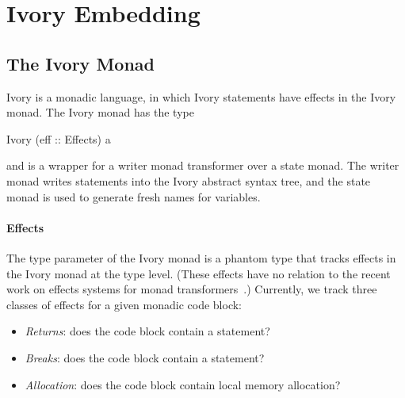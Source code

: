 \section{Ivory Embedding}
\label{sec:ivory-embedding}


\subsection{The Ivory Monad}



Ivory is a monadic language, in which Ivory statements have effects in the Ivory
monad. The Ivory monad has the type

\begin{code}
Ivory (eff :: Effects) a
\end{code}

\noindent
and is a wrapper for a writer monad transformer over a state monad. The writer
monad writes statements into the Ivory abstract syntax tree, and the
state monad is used to generate fresh names for variables.

\paragraph{Effects}
The  type parameter of the Ivory monad is a phantom type that tracks
effects in the Ivory monad at the type level. (These effects have no relation to
the recent work on effects systems for monad transformers~\cite{}.) Currently,
we track three classes of effects for a given monadic code block:

\begin{itemize}
\item \emph{Returns}: does the code block contain a  statement?
\item \emph{Breaks}: does the code block contain a  statement?
\item \emph{Allocation}: does the code block contain local memory allocation?
\end{itemize}

